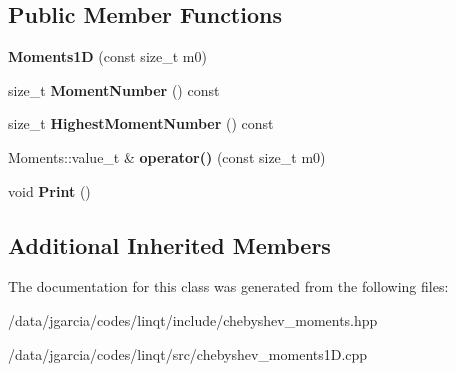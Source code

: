 \subsection*{Public Member Functions}
\begin{DoxyCompactItemize}
\item 
{\bfseries Moments1D} (const size\+\_\+t m0)\hypertarget{classchebyshev_1_1_moments1_d_a921572420e08c2746ed6ec7ed409e059}{}\label{classchebyshev_1_1_moments1_d_a921572420e08c2746ed6ec7ed409e059}

\item 
size\+\_\+t {\bfseries Moment\+Number} () const \hypertarget{classchebyshev_1_1_moments1_d_a75667f392f26c85efc222d2ce932d2ee}{}\label{classchebyshev_1_1_moments1_d_a75667f392f26c85efc222d2ce932d2ee}

\item 
size\+\_\+t {\bfseries Highest\+Moment\+Number} () const \hypertarget{classchebyshev_1_1_moments1_d_abbba059822f9998e4d75c04398d4abac}{}\label{classchebyshev_1_1_moments1_d_abbba059822f9998e4d75c04398d4abac}

\item 
Moments\+::value\+\_\+t \& {\bfseries operator()} (const size\+\_\+t m0)\hypertarget{classchebyshev_1_1_moments1_d_a2bfb6aa6b14a637eaa6acf877cf75fb2}{}\label{classchebyshev_1_1_moments1_d_a2bfb6aa6b14a637eaa6acf877cf75fb2}

\item 
void {\bfseries Print} ()\hypertarget{classchebyshev_1_1_moments1_d_abb8de7793a9246acb6830068415353d8}{}\label{classchebyshev_1_1_moments1_d_abb8de7793a9246acb6830068415353d8}

\end{DoxyCompactItemize}
\subsection*{Additional Inherited Members}


The documentation for this class was generated from the following files\+:\begin{DoxyCompactItemize}
\item 
/data/jgarcia/codes/linqt/include/chebyshev\+\_\+moments.\+hpp\item 
/data/jgarcia/codes/linqt/src/chebyshev\+\_\+moments1\+D.\+cpp\end{DoxyCompactItemize}
